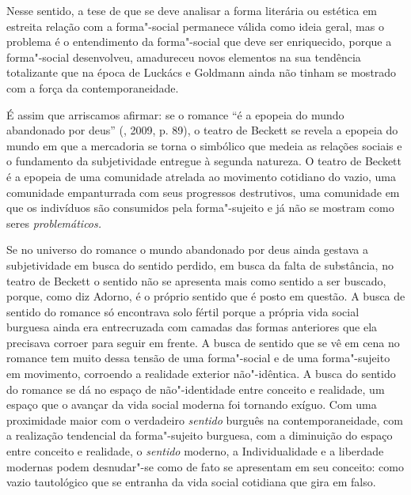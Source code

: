 {Nesse sentido, a tese de que se deve analisar a forma literária ou
estética em estreita relação com a forma"-social permanece válida como
ideia geral, mas o problema é o entendimento da forma"-social que deve
ser enriquecido, porque a forma"-social desenvolveu, amadureceu novos
elementos na sua tendência totalizante que na época de Luckács e
Goldmann ainda não tinham se mostrado com a força da contemporaneidade.

É assim que arriscamos afirmar: se o romance ``é a epopeia do mundo
abandonado por deus'' (, 2009, p. 89), o teatro de Beckett se
revela a epopeia do mundo em que a mercadoria se torna o simbólico que
medeia as relações sociais e o fundamento da subjetividade entregue à
segunda natureza. O teatro de Beckett é a epopeia de uma comunidade
atrelada ao movimento cotidiano do vazio, uma comunidade empanturrada
com seus progressos destrutivos, uma comunidade em que os indivíduos são
consumidos pela forma"-sujeito e já não se mostram como seres
\emph{problemáticos.}

Se no universo do romance o mundo abandonado por deus ainda gestava a
subjetividade em busca do sentido perdido, em busca da falta de
substância, no teatro de Beckett o sentido não se apresenta mais como
sentido a ser buscado, porque, como diz Adorno, é o próprio sentido que
é posto em questão. A busca de sentido do romance só encontrava solo
fértil porque a própria vida social burguesa ainda era entrecruzada com
camadas das formas anteriores que ela precisava corroer para seguir em
frente. A busca de sentido que se vê em cena no romance tem muito dessa
tensão de uma forma"-social e de uma forma"-sujeito em movimento,
corroendo a realidade exterior não"-idêntica. A busca do sentido do
romance se dá no espaço de não"-identidade entre conceito e realidade, um
espaço que o avançar da vida social moderna foi tornando exíguo. Com uma
proximidade maior com o verdadeiro \emph{sentido} burguês na
contemporaneidade, com a realização tendencial da forma"-sujeito
burguesa, com a diminuição do espaço entre conceito e realidade, o
\emph{sentido} moderno, a Individualidade e a liberdade modernas podem
desnudar"-se como de fato se apresentam em seu conceito: como vazio
tautológico que se entranha da vida social cotidiana que gira em falso.

}
